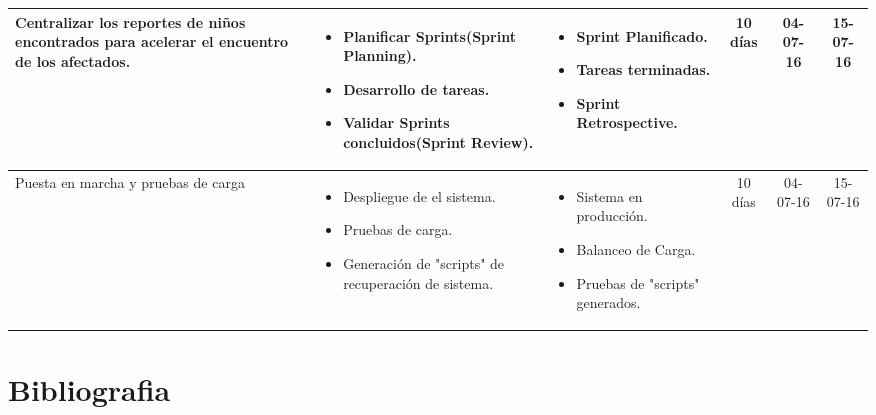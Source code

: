 \documentclass[letter,11pt,oneside,spanish]{article}
\begin{document}
\begin{table}
\centering
\begin{tabular}{|p{3.5cm}|p{3.5cm}|p{3.5cm}|c|c|c|}
	\hline
	Centralizar los reportes de niños encontrados para acelerar el encuentro de los afectados. & \begin{itemize}[leftmargin=*]
	 																					\item Planificar Sprints(Sprint Planning).
																					 	\item Desarrollo de tareas.
																					 	\item Validar Sprints concluidos(Sprint Review).
																					\end{itemize}  	& \begin{itemize}[leftmargin=*]
	 																					\item Sprint Planificado.
																					 	\item Tareas terminadas.
																					 	\item Sprint Retrospective.
																					\end{itemize}  	& 10 días & 04-07-16 & 15-07-16										\\ 
	\hline %
	Puesta en marcha y pruebas de carga & \begin{itemize}[leftmargin=*]
	 																					\item Despliegue de el sistema.
																					 	\item Pruebas de carga.
																					 	\item Generación de "scripts" de recuperación de sistema.
																					\end{itemize}  	& \begin{itemize}[leftmargin=*]
	 																					\item Sistema en producción.
																					 	\item Balanceo de Carga.
																					 	\item Pruebas de "scripts" generados.
																					\end{itemize}  	& 10 días & 04-07-16 & 15-07-16										\\ 
	\hline %
\end{tabular}
\end{table}

\newpage

\section{Bibliografia}
\end{document}
